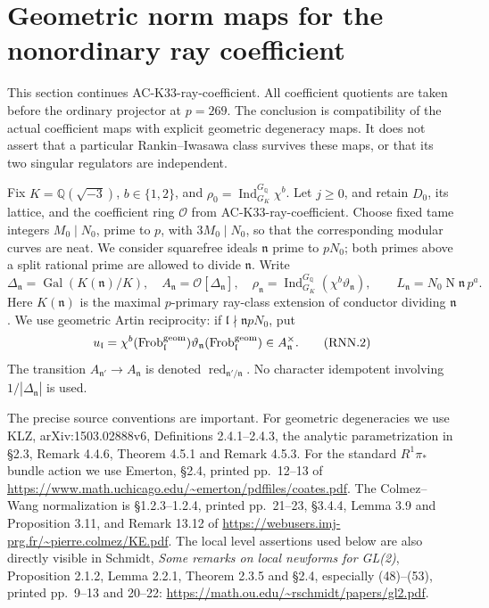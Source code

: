 \section{Geometric norm maps for the nonordinary ray coefficient}
\label{sec:nonordinary-ray-norm}

This section continues AC-K33-ray-coefficient.  All coefficient quotients
are taken before the ordinary projector at \(p=269\).  The conclusion is
compatibility of the actual coefficient maps with explicit geometric
degeneracy maps.  It does not assert that a particular Rankin--Iwasawa
class survives these maps, or that its two singular regulators are
independent.

Fix \(K=\mathbb Q(\sqrt{-3})\), \(b\in\{1,2\}\), and
\(\rho_0=\operatorname{Ind}_{G_K}^{G_{\mathbb Q}}\chi^b\).
Let \(j\geq0\), and retain \(D_0\), its lattice, and the coefficient
ring \(\mathcal O\) from AC-K33-ray-coefficient.
Choose fixed tame integers \(M_0\mid N_0\), prime to \(p\), with
\(3M_0\mid N_0\), so that the corresponding modular curves are neat.
We consider squarefree ideals \(\mathfrak n\) prime to \(pN_0\);
both primes above a split rational prime are allowed to divide
\(\mathfrak n\).  Write
\[
 \Delta_{\mathfrak n}=\operatorname{Gal}(K(\mathfrak n)/K),\quad
 A_{\mathfrak n}=\mathcal O[\Delta_{\mathfrak n}],\quad
 \rho_{\mathfrak n}
   =\operatorname{Ind}_{G_K}^{G_{\mathbb Q}}
       (\chi^b\vartheta_{\mathfrak n}),
 \qquad
 L_{\mathfrak n}=N_0\operatorname N\mathfrak n\,p^a .
 \tag{RNN.1}
\]
Here \(K(\mathfrak n)\) is the maximal \(p\)-primary ray-class
extension of conductor dividing \(\mathfrak n\).
We use geometric Artin reciprocity: if
\(\mathfrak l\nmid\mathfrak n pN_0\), put
\[
 u_{\mathfrak l}
   =\chi^b(\operatorname{Frob}_{\mathfrak l}^{\rm geom})
      \vartheta_{\mathfrak n}
         (\operatorname{Frob}_{\mathfrak l}^{\rm geom})
       \in A_{\mathfrak n}^{\times}.
 \tag{RNN.2}
\]
The transition \(A_{\mathfrak n'}\to A_{\mathfrak n}\) is denoted
\(\operatorname{red}_{\mathfrak n'/\mathfrak n}\).
No character idempotent involving \(1/|\Delta_{\mathfrak n}|\) is used.

The precise source conventions are important.  For geometric
degeneracies we use KLZ, arXiv:1503.02888v6, Definitions 2.4.1--2.4.3,
the analytic parametrization in \S2.3, Remark 4.4.6, Theorem 4.5.1
and Remark 4.5.3.  For the standard \(R^1\pi_*\) bundle action we
use Emerton, \S2.4, printed pp.~12--13 of
\url{https://www.math.uchicago.edu/~emerton/pdffiles/coates.pdf}.
The Colmez--Wang normalization is \S1.2.3--1.2.4, printed pp.~21--23,
\S3.4.4, Lemma 3.9 and Proposition 3.11, and Remark 13.12 of
\url{https://webusers.imj-prg.fr/~pierre.colmez/KE.pdf}.
The local level assertions used below are also directly visible in
Schmidt, \emph{Some remarks on local newforms for GL(2)},
Proposition 2.1.2, Lemma 2.2.1, Theorem 2.3.5 and \S2.4,
especially (48)--(53), printed pp.~9--13 and 20--22:
\url{https://math.ou.edu/~rschmidt/papers/gl2.pdf}.

